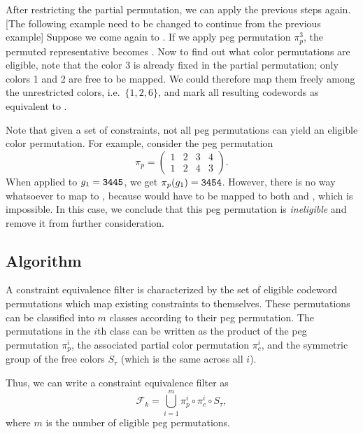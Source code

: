 After restricting the partial permutation, we can apply the previous steps again. 
[The following example need to be changed to continue from the previous example] Suppose we come again to . If we apply peg permutation $\pi_p^3$, the permuted representative becomes . Now to find out what color permutations are eligible, note that the color 3 is already fixed in the partial permutation; only colors 1 and 2 are free to be mapped. We could therefore map them freely among the unrestricted colors, i.e.\ $\{1, 2, 6\}$, and mark all resulting codewords as equivalent to .

Note that given a set of constraints, not all peg permutations can yield an eligible color permutation. For example, consider the peg permutation
\[
\pi_p = 
\begin{pmatrix}
1 & 2 & 3 & 4 \\
1 & 2 & 4 & 3
\end{pmatrix} .
\]
When applied to $g_1 = \texttt{3445}$, we get $\pi_p(g_1) = \texttt{3454}$. However, there is no way whatsoever to map  to , because  would have to be mapped to both  and , which is impossible. In this case, we conclude that this peg permutation is \emph{ineligible} and remove it from further consideration.

\subsection{Algorithm}


A constraint equivalence filter is characterized by the set of eligible codeword permutations which map existing constraints to themselves. These permutations 
can be classified into $m$ classes according to their peg permutation. The permutations in the $i$th class can be written as the product of the peg permutation $\pi_p^i$, the associated partial color permutation $\pi_c^i$, and the symmetric group of the free colors $S_\tau$ (which is the same across all $i$). 

Thus, we can write a constraint equivalence filter as
\[
\mathcal{F}_k = \bigcup_{i=1}^m \pi_p^i \circ \pi_c^i \circ S_\tau ,
\]
where $m$ is the number of eligible peg permutations.


